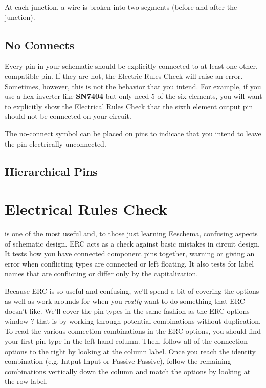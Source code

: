 At each junction, a wire is broken into two segments (before and after the junction).

\subsection{No Connects}
\label{sec:noconnect}
Every pin in your schematic should be explicitly connected to at least one other, compatible pin.
If they are not, the Electric Rules Check will raise an error.
Sometimes, however, this is not the behavior that you intend.
For example, if you use a hex inverter like \textbf{SN7404} but only need 5 of the six elements, you will want to explicitly show the Electrical Rules Check that the sixth element output pin should not be connected on your circuit.

The no-connect symbol can be placed on pins to indicate that you intend to leave the pin electrically unconnected.

\subsection{Hierarchical Pins}


\section{Electrical Rules Check}

 is one of the most useful and, to those just learning Eeschema, confusing aspects of schematic design.
ERC acts as a check against basic mistakes in circuit design.
It tests how you have connected component pins together, warning or giving an error when conflicting types are connected or left floating.
It also tests for label names that are conflicting or differ only by the capitalization.

Because ERC is so useful and confusing, we'll spend a bit of covering the options as well as work-arounds for when you \textit{really} want to do something that ERC doesn't like.
We'll cover the pin types in the same fashion as the ERC options window ? that is by working through potential combinations without duplication.
To read the various connection combinations in the ERC options, you should find your first pin type in the left-hand column.
Then, follow all of the connection options to the right by looking at the column label.
Once you reach the identity combination (e.g. Intput-Input or Passive-Passive), follow the remaining combinations vertically down the column and match the options by looking at the row label.

